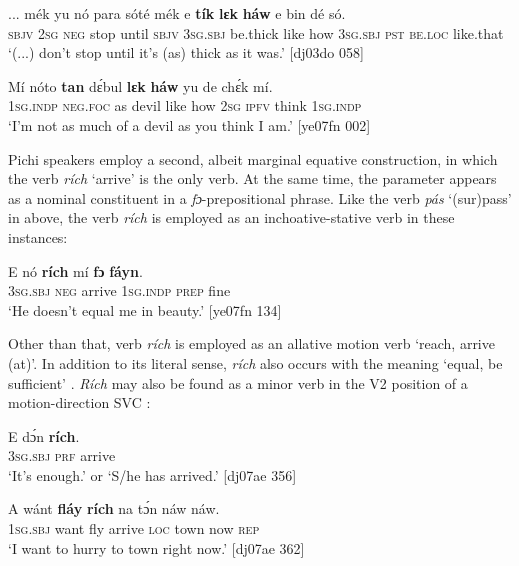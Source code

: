 \ea%
\label{ex:key:508}
\gll  \op...\cp{}  mék    yu  nó  para    sóté    mék    e    \textbf{tík}    \textbf{lɛk}  \textbf{háw}
e    bin  dé    só.\\
{}  \textsc{sbjv}    \textsc{2sg}  \textsc{neg}  stop    until  \textsc{sbjv}    \textsc{3sg.sbj}  be.thick  like  how  
\textsc{3sg.sbj}  \textsc{pst}  \textsc{be.loc}  like.that \\
\glt ‘(...) don’t stop until it’s (as) thick as it was.’ [dj03do 058]
\z


\ea%
    \label{ex:key:509}
    \gll Mí    nóto  \textbf{tan}  dɛ́bul  \textbf{lɛk}  \textbf{háw}    yu  de  chɛ́k  mí.\\
\textsc{1sg.indp}  \textsc{neg}.\textsc{foc}  as  devil  like  how    \textsc{2sg}  \textsc{ipfv}  think  \textsc{1sg.indp}\\

\glt ‘I’m not as much of a devil as you think I am.’ [ye07fn 002]
\z

Pichi speakers employ a second, albeit marginal equative construction, in which the verb \textit{rích} ‘arrive’ is the only verb. At the same time, the parameter appears as a nominal constituent in a \textit{fɔ}{}-prepositional phrase. Like the verb \textit{pás} ‘(sur)pass’ in  above, the verb \textit{rích} is employed as an inchoative-stative verb in these instances: 


\ea%
    \label{ex:key:510}
    \gll E    nó  \textbf{rích}    mí    \textbf{fɔ}  \textbf{fáyn}.\\
\textsc{3sg.sbj}  \textsc{neg}  arrive  \textsc{1sg.indp}  \textsc{prep}  fine\\

\glt ‘He doesn’t equal me in beauty.’ [ye07fn 134]
\z

Other than that, verb \textit{rích} is employed as an allative motion verb ‘reach, arrive (at)’. In addition to its literal sense, \textit{rích} also occurs with the meaning ‘equal, be sufficient’ . \textit{Rích} may also be found as a minor verb in the V2 position of a motion-direction SVC : 


\ea%
    \label{ex:key:511}
    \gll E    dɔ́n  \textbf{rích}.\\
\textsc{3sg.sbj}  \textsc{prf}  arrive\\

\glt ‘It’s enough.’ or ‘S/he has arrived.’ [dj07ae 356]
\z


\ea%
    \label{ex:key:512}
    \gll A    wánt  \textbf{fláy}  \textbf{rích}    na  tɔ́n    náw  náw.\\
\textsc{1sg.sbj}  want  fly  arrive  \textsc{loc}  town  now  \textsc{rep}\\

\glt ‘I want to hurry to town right now.’ [dj07ae 362]
\z

